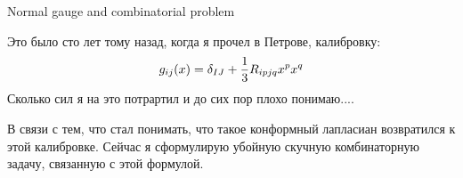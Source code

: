  





\baselineskip=14pt
\def\vare {\varepsilon}
\def\A {{\bf A}}
\def\t {\tilde}
\def\a {\alpha}
\def\d {\delta}
\def\K {{\bf K}}
\def\N {{\bf N}}
\def\w {\omega}
\def\s {{\sigma}}
\def\S {{\Sigma}}
\def\s {{\sigma}}
\def\p{\partial}
\def\vare{{\varepsilon}}
\def\Q {{\bf Q}}
\def\D {{\cal D}}
\def\G {{\Gamma}}
\def\C {{\bf C}}
\def\L {{\cal L}}
\def\Z {{\bf Z}}
\def\U  {{\cal U}}
\def\H {{\bf H}}
\def\R  {{\bf R}}
\def\S  {{\bf S}}
\def\E  {{\bf E}}
\def\l {\lambda}
\def\degree {{\bf {\rm degree}\,\,}}
\def \finish {${\,\,\vrule height1mm depth2mm width 8pt}$}
\def \m {\medskip}
\def\p {\partial}
\def\r {{\bf r}}
\def\pt {{\bf pt}}
\def\v {{\bf v}}
\def\n {{\bf n}}
\def\t {{\bf t}}
\def\b {{\bf b}}
\def\c {{\bf c }}
\def\e{{\bf e}}
\def\ac {{\bf a}}
\def \X   {{\bf X}}
\def \Y   {{\bf Y}}
\def \x   {{\bf x}}
\def \y   {{\bf y}}
\def\ss  {\sigma_{\rm sph}}
\def\grad {{\rm grad\,}}

\centerline{Normal gauge and combinatorial problem}

Это было сто лет тому назад, когда я 
прочел в Петрове, калибровку:
      $$
g_{ij}(x)=\delta_{IJ}+{1\over 3}R_{ipjq}x^px^q
       $$      
   Сколько сил я на это потрартил и до сих пор плохо понимаю....

   В связи с тем, что стал понимать, 
что такое конформный лапласиан 
возвратился к этой калибровке. 
   Сейчас я сформулирую убойную скучную комбинаторную
задачу, связанную с этой формулой.

